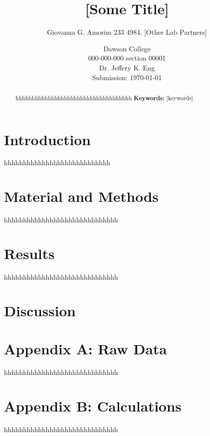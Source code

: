 \documentclass[letterpaper]{article}
\title{[Some Title]}
\author{Giovanna G. Amorim 233 4984, [Other Lab Partners]}
\date{Dawson College \\[15pt]
000-000-000 section 00001\\[15pt]
Dr. Jeffery K. Eng\\[15pt]
Submission: \today}
\begin{document}
\maketitle

\begin{abstract}
    hhhhhhhhhhhhhhhhhhhhhhhhhhhhhhhhhhhh
	\noindent\textbf{Keywords:} [keywords]
\end{abstract}

\tableofcontents

\newpage

\section{Introduction}
\label{sec:introduction}

hhhhhhhhhhhhhhhhhhhhhhhhhhhh

\section{Material and Methods}
\label{sec:matandmet}

hhhhhhhhhhhhhhhhhhhhhhhhhhhhhh

\section{Results}
\label{sec:results}

hhhhhhhhhhhhhhhhhhhhhhhhhhhhhh

\section{Discussion}
\label{sec:discussion}



\printbibliography[heading=bibintoc]

\section*{Appendix A: Raw Data}
\label{sec:appendixa}

hhhhhhhhhhhhhhhhhhhhhhhhhhhhhh

\section*{Appendix B: Calculations}
\label{sec:appendixb}

hhhhhhhhhhhhhhhhhhhhhhhhhhhhhh
\end{document}
